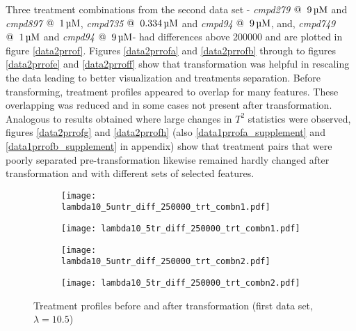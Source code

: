 \documentclass[11pt]{article}
\begin{document}
\par{Three treatment combinations from the second data set - \textit{cmpd279} $@ \hspace{2mm} \SI{9}{\micro M}$ and \textit{cmpd897} $@ \hspace{2mm} \SI{1}{\micro M}$, \textit{cmpd735} $@ \hspace{2mm} \SI{0.334}{\micro M}$ and \textit{cmpd94} $@ \hspace{2mm} \SI{9}{\micro M}$, and, \textit{cmpd749} $@ \hspace{2mm} \SI{1}{\micro M}$ and \textit{cmpd94} $@ \hspace{2mm} \SI{9}{\micro M}$- had differences above 200000 and are plotted in figure \ref{data2prrof}. Figures \ref{data2prrofa} and \ref{data2prrofb} through to figures \ref{data2prrofe} and \ref{data2prroff} show that transformation was helpful in rescaling the data leading to better visualization and treatments separation. Before transforming, treatment profiles appeared to overlap for many features. These overlapping was reduced and in some cases not present after transformation. Analogous to results obtained where large changes in $T^2$ statistics were observed, figures \ref{data2prrofg} and \ref{data2prrofh} (also \ref{data1prrofa_supplement} and \ref{data1prrofb_supplement} in appendix) show that treatment pairs that were poorly separated pre-transformation likewise remained hardly changed after transformation and with different sets of selected features.}
\clearpage
\begin{figure}
\begin{subfigure}{.5\textwidth}
  \centering
  \texttt{[image: lambda10\_5untr\_diff\_250000\_trt\_combn1.pdf]}
  \caption{}
  \label{data1prrofa}
\end{subfigure}%
\begin{subfigure}{.5\textwidth}
  \centering
  \texttt{[image: lambda10\_5tr\_diff\_250000\_trt\_combn1.pdf]}
  \caption{}
  \label{data1prrofb}
\end{subfigure}
\begin{subfigure}{.5\textwidth}
  \centering
  \texttt{[image: lambda10\_5untr\_diff\_250000\_trt\_combn2.pdf]}
  \caption{}
  \label{data1prrofc}
\end{subfigure}%
\begin{subfigure}{.5\textwidth}
  \centering
  \texttt{[image: lambda10\_5tr\_diff\_250000\_trt\_combn2.pdf]}
  \caption{}
  \label{data1prrofd}
\end{subfigure}
\caption{Treatment profiles before and after transformation (first data set, $\lambda = 10.5$)}
\label{data1prrof}
\end{figure}
\end{document}
